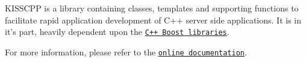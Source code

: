 K\-I\-S\-S\-C\-P\-P is a library containing classes, templates and supporting functions to facilitate rapid application development of C++ server side applications. It is in it's part, heavily dependent upon the \href{http://boost.org}{\tt C++ Boost libraries}.

For more information, please refer to the \href{http://thelastcylon.github.io/kisscpp/index.html}{\tt online documentation}. 